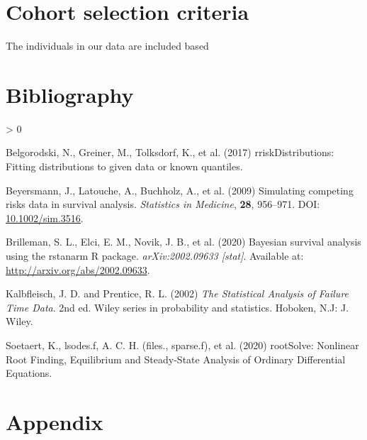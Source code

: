 \documentclass[
  10pt,
  a4paper,
]{article}
\newlength{\cslhangindent}
\newenvironment{CSLReferences}[2] %
 {%
  \setlength{\parindent}{0pt}
  \ifodd #1 \everypar{\setlength{\hangindent}{\cslhangindent}}\ignorespaces\fi
  \ifnum #2 > 0
  \setlength{\parskip}{#2\baselineskip}
  \fi
 }%
 {}
\begin{document}
\hypertarget{cohort-selection-criteria}{%
\section{Cohort selection criteria}\label{cohort-selection-criteria}}

The individuals in our data are included based

\hypertarget{bibliography}{%
\section{Bibliography}\label{bibliography}}

\hypertarget{refs}{}
\begin{CSLReferences}{1}{0}
\leavevmode\hypertarget{ref-belgorodski_rriskdistributions_2017}{}%
Belgorodski, N., Greiner, M., Tolksdorf, K., et al. (2017)
{rriskDistributions}: {Fitting} distributions to given data or known
quantiles.

\leavevmode\hypertarget{ref-beyersmann_simulating_2009}{}%
Beyersmann, J., Latouche, A., Buchholz, A., et al. (2009) Simulating
competing risks data in survival analysis. \emph{Statistics in
Medicine}, \textbf{28}, 956--971. DOI:
\href{https://doi.org/10.1002/sim.3516}{10.1002/sim.3516}.

\leavevmode\hypertarget{ref-brilleman_bayesian_2020}{}%
Brilleman, S. L., Elci, E. M., Novik, J. B., et al. (2020) Bayesian
survival analysis using the rstanarm {R} package. \emph{arXiv:2002.09633
{[}stat{]}}. Available at: \url{http://arxiv.org/abs/2002.09633}.

\leavevmode\hypertarget{ref-kalbfleisch_statistical_2002}{}%
Kalbfleisch, J. D. and Prentice, R. L. (2002) \emph{The Statistical
Analysis of Failure Time Data}. 2nd ed. Wiley series in probability and
statistics. {Hoboken, N.J}: {J. Wiley}.

\leavevmode\hypertarget{ref-soetaert_rootsolve_2020}{}%
Soetaert, K., lsodes.f, A. C. H. (files., sparse.f), et al. (2020)
{rootSolve}: {Nonlinear Root Finding}, {Equilibrium} and {Steady}-{State
Analysis} of {Ordinary Differential Equations}.

\end{CSLReferences}

\renewcommand{\thesection}{\Alph{section}}
\setcounter{section}{0}

\hypertarget{appendix}{%
\section{Appendix}\label{appendix}}
\end{document}
